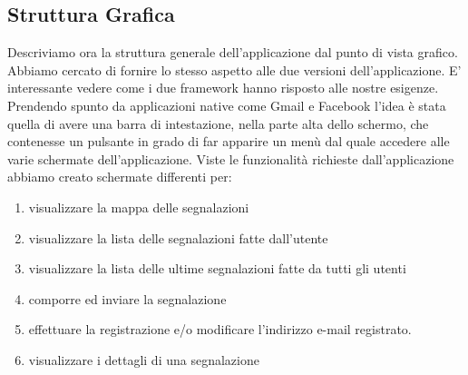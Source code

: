         \subsection{Struttura Grafica}
        \label{subsec:structgraphic}
            Descriviamo ora la struttura generale dell'applicazione dal punto
            di vista grafico.
            Abbiamo cercato di fornire lo stesso aspetto alle due versioni
            dell'applicazione. E' interessante vedere come i due frame\-work hanno risposto
            alle nostre esigenze. Prendendo spunto da applicazioni native come
            Gmail e Facebook l'idea è stata quella di avere una barra di intestazione,
            nella parte alta dello schermo, che contenesse un pulsante in grado di
            far apparire un menù dal quale accedere alle varie schermate dell'applicazione.
            Viste le funzionalità richieste dall'applicazione abbiamo creato schermate
            differenti per:
            \begin{enumerate}
                \item visualizzare la mappa delle segnalazioni
                \item visualizzare la lista delle segnalazioni fatte dall'utente
                \item visualizzare la lista delle ultime segnalazioni fatte da tutti gli utenti
                \item comporre ed inviare la segnalazione
                \item effettuare la registrazione e/o modificare l'indirizzo e-mail registrato.
                \item visualizzare i dettagli di una segnalazione
            \end{enumerate}

